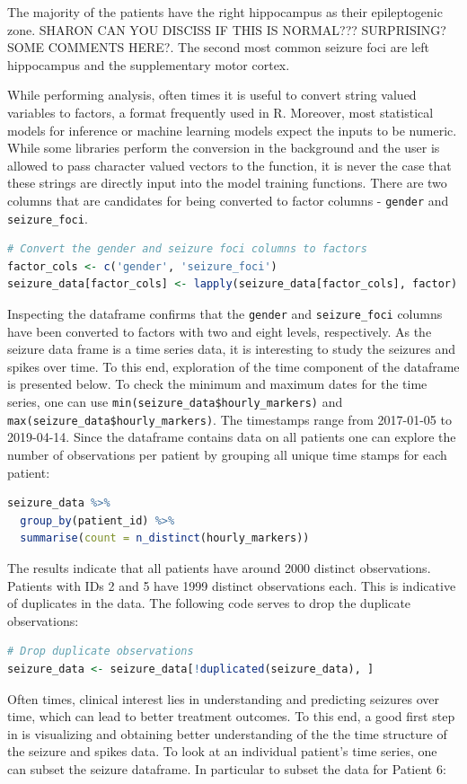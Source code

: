 The majority of the patients have the right hippocampus as their epileptogenic zone. {SHARON CAN YOU DISCISS IF THIS IS NORMAL??? SURPRISING? SOME COMMENTS HERE?}. The second most common seizure foci are left hippocampus and the supplementary motor cortex.

While performing analysis, often times it is useful to convert string valued variables to factors, a format frequently used in R. Moreover, most statistical models for inference or machine learning models expect the inputs to be numeric. While some libraries perform the conversion in the background and the user is allowed to pass character valued vectors to the function, it is never the case that these strings are directly input into the model training functions. There are two columns that are candidates for being converted to factor columns - \verb|gender| and \verb|seizure_foci|.
\begin{lstlisting}[language=R]
# Convert the gender and seizure foci columns to factors
factor_cols <- c('gender', 'seizure_foci')
seizure_data[factor_cols] <- lapply(seizure_data[factor_cols], factor)
\end{lstlisting}
Inspecting the dataframe confirms that the \verb|gender| and \verb|seizure_foci| columns have been converted to factors with two and eight levels, respectively.
As the seizure data frame is a time series data, it is interesting to study the seizures and spikes over time. To this end, exploration of the time component of the dataframe is presented below. To check the minimum and maximum dates for the time series, one can use \verb|min(seizure_data$hourly_markers)| and \verb|max(seizure_data$hourly_markers)|. The timestamps range from 2017-01-05 to 2019-04-14.
Since the dataframe contains data on all patients one can explore the number of observations per patient by grouping all unique time stamps for each patient:
\begin{lstlisting}[language=R]
seizure_data %>%
  group_by(patient_id) %>%
  summarise(count = n_distinct(hourly_markers))
\end{lstlisting}
The results indicate that all patients have around 2000 distinct observations. Patients with IDs 2 and 5 have 1999 distinct observations each. This is indicative of duplicates in the data. The following code serves to drop the duplicate observations:
\begin{lstlisting}[language=R]
# Drop duplicate observations
seizure_data <- seizure_data[!duplicated(seizure_data), ]
\end{lstlisting}
Often times, clinical interest lies in understanding and predicting seizures over time, which can lead to better treatment outcomes. To this end, a good first step in is visualizing and obtaining better understanding of the the time structure of the seizure and spikes data. To look at an individual patient's time series, one can subset the seizure dataframe. In particular to subset the data for Patient 6:
